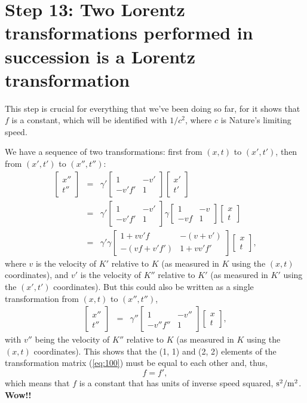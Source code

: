 \documentclass[twocolumn,preprintnumbers,amsmath,amssymb,final]{revtex4}
\def\BEq{\begin{equation}}
\def\EEq{\end{equation}}
\def\BEqA{\begin{eqnarray}}
\def\EEqA{\end{eqnarray}}
\def\g{\gamma}
\begin{document}
\section*{Step 13: Two Lorentz transformations performed in succession is a Lorentz transformation}
 
This step is crucial for everything that we've been doing so far, for it shows that $f$ is a constant, which will be identified with $1/c^2$, where $c$ is Nature's limiting speed.

We have a sequence of two transformations: first from $(x,t)$ to $(x',t')$, then from
$(x',t')$ to $(x'',t'')$: 
\BEqA
\label{eq:100}
\begin{bmatrix}
x'' \\ t''
\end{bmatrix}
&=&
\g'
\begin{bmatrix}
1 & -v'  \\
-v'f' & 1
\end{bmatrix}
\begin{bmatrix}
x' \\ t'
\end{bmatrix}
\nonumber \\
&=&
\g'
\begin{bmatrix}
1 & -v'  \\
-v'f' & 1
\end{bmatrix}
\g
\begin{bmatrix}
1 & -v  \\
-vf & 1
\end{bmatrix}
\begin{bmatrix}
x \\ t
\end{bmatrix}
\nonumber \\
&=&
\g'\g
\begin{bmatrix}
1+vv'f & -(v+v')  \\
-(vf+v'f') & 1+vv'f'
\end{bmatrix}
\begin{bmatrix}
x \\ t
\end{bmatrix},
\EEqA
where $v$ is the velocity of $K'$ relative to $K$ (as measured in $K$ using the $(x,t)$ coordinates), 
and $v'$ is the velocity of $K''$ relative to $K'$ (as measured in $K'$ using the $(x',t')$ coordinates). But this could also be written as a single transformation from $(x,t)$ to $(x'',t'')$,
\BEqA
\label{eq:101}
\begin{bmatrix}
x'' \\ t''
\end{bmatrix}
&=&
\g''
\begin{bmatrix}
1 & -v''  \\
-v''f'' & 1
\end{bmatrix}
\begin{bmatrix}
x \\ t
\end{bmatrix},
\EEqA
with $v''$ being the velocity of $K''$ relative to $K$ (as measured in $K$ using the $(x,t)$ coordinates). 
This shows that the (1, 1) and (2, 2) elements of the transformation matrix (\ref{eq:100}) must be 
equal to each other and, thus,
\BEq
f=f',
\EEq
which means that $f$ is a constant that has units of inverse speed squared,
${\rm s}^2/{\rm m}^2$. 
{\bf Wow!!}
\end{document}
